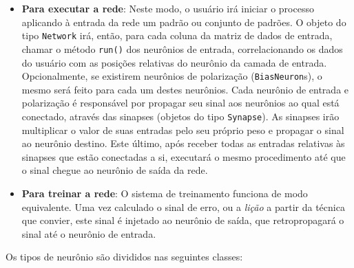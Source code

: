 \begin{itemize}
\item \textbf{Para executar a rede}: Neste modo, o usuário irá iniciar o
processo aplicando à entrada da rede um padrão ou conjunto de padrões. O
objeto do tipo \texttt{Network} irá, então, para cada coluna da matriz de dados
de entrada, chamar o método \texttt{run()} dos neurônios de entrada,
correlacionando os dados do usuário com as posições relativas do neurônio da
camada de entrada. Opcionalmente, se existirem neurônios de polarização
(\texttt{BiasNeuron}s), o mesmo será feito para cada um destes neurônios. Cada
neurônio de entrada e polarização é responsável por propagar seu sinal aos
neurônios ao qual está conectado, através das sinapses (objetos do tipo
\texttt{Synapse}). As sinapses irão multiplicar o valor de suas entradas pelo
seu próprio peso e propagar o sinal ao neurônio destino. Este último, após
receber todas as entradas relativas às sinapses que estão conectadas a si,
executará o mesmo procedimento até que o sinal chegue ao neurônio de saída da
rede.

\item \textbf{Para treinar a rede}: O sistema de treinamento funciona de 
modo equivalente. Uma vez calculado o sinal de erro, ou a \textit{lição} a
partir da técnica que convier, este sinal é injetado ao neurônio de saída, que
retropropagará o sinal até o neurônio de entrada.
\end{itemize}

Os tipos de neurônio são divididos nas seguintes classes:

